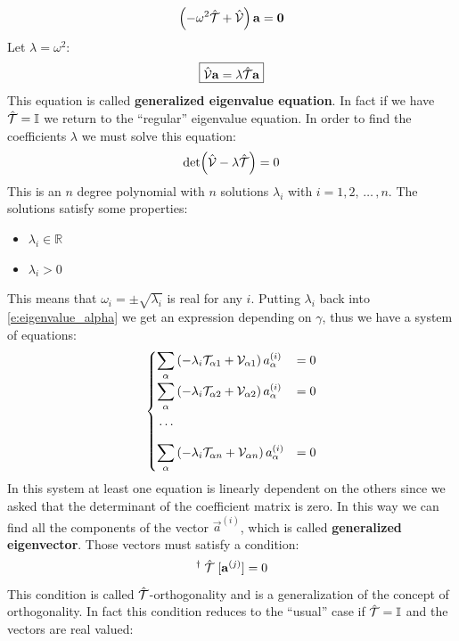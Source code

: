 \begin{equation}
    \left(-\omega^2\hat{\mathcal{T}} + \hat{\mathcal{V}}\right)\vb{a} = \vb{0}
\end{equation}
Let $\lambda = \omega^2$:
\begin{equation}
    \boxed{\hat{\mathcal{V}}\vb{a} = \lambda\hat{\mathcal{T}}\vb{a}}
\end{equation}
This equation is called \textbf{generalized eigenvalue equation}. In fact if we have $\hat{\mathcal{T}} = \mathbb{I}$ we return to the ``regular'' eigenvalue equation. In order to find the coefficients $\lambda$ we must solve this equation:
\begin{equation}
    \det(\hat{\mathcal{V}}-\lambda\hat{\mathcal{T}}) = 0
\end{equation}
This is an $n$ degree polynomial with $n$ solutions $\lambda_i$ with $i=1,2, \,\dots\, ,n$. The solutions satisfy some properties:
\begin{itemize}
    \item $\lambda_i \in \mathbb{R}$
    \item $\lambda_i > 0$
\end{itemize}
This means that $\omega_i = \pm \sqrt{\lambda_i}$ is real for any $i$. Putting $\lambda_i$ back into \eqref{e:eigenvalue_alpha} we get an expression depending on $\gamma$, thus we have a system of equations:
\begin{equation}
    \begin{cases}
        \displaystyle\sum_{\alpha}\left(-\lambda_i\mathcal{T}_{\alpha 1} + \mathcal{V}_{\alpha 1}\right)a_{\alpha}^{(i)} &= 0\\[10pt]
        \displaystyle\sum_{\alpha}\left(-\lambda_i\mathcal{T}_{\alpha 2} + \mathcal{V}_{\alpha 2}\right)a_{\alpha}^{(i)} &= 0\\[10pt]
         \,\dots\, \\[10pt]
        \displaystyle\sum_{\alpha}\left(-\lambda_i\mathcal{T}_{\alpha n} + \mathcal{V}_{\alpha n}\right)a_{\alpha}^{(i)} &= 0
    \end{cases}
\end{equation}
In this system at least one equation is linearly dependent on the others since we asked that the determinant of the coefficient matrix is zero. In this way we can find all the components of the vector $\vec{a}^{(i)}$, which is called \textbf{generalized eigenvector}.
Those vectors must satisfy a condition:
\begin{equation}
    [\vec{a}^{(i)}]^{\dagger}\;\hat{\Telegant}\;[\vec{a}^{(j)}] = 0
\end{equation}
This condition is called $\hat{\mathcal{T}}$-orthogonality and is a generalization of the concept of orthogonality. In fact this condition reduces to the ``usual'' case if $\hat{\mathcal{T}} = \mathbb{I}$ and the vectors are real valued:

